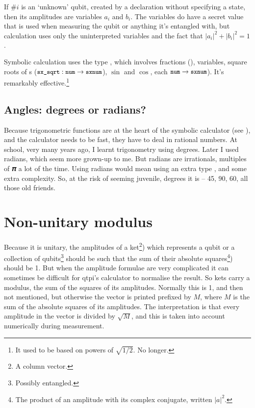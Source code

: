 If $\#i${} is an `unknown' qubit, created by a  declaration without specifying a state, then its amplitudes are variables $a_{i}$ and $b_{i}$. The variables do have a secret value that is used when measuring the qubit or anything it's entangled with, but calculation uses only the uninterpreted variables and the fact that $|a_{i}|^{2}+|b_{i}|^{2}=1$.

Symbolic calculation uses the type , which involves fractions (), variables, square roots of s ($\texttt{\small{}sx\_sqrt}: \texttt{\small{}num}->\texttt{\small{}sxnum}$), $\sin$ and $\cos$, each $\texttt{\small{}num}->\texttt{\small{}sxnum}$). It's remarkably effective.\footnote{It used to be based on powers of $\sqrt{1/2}$. No longer.}

\subsection{Angles: degrees or radians?}

Because trigonometric functions are at the heart of the symbolic calculator (see ), and the calculator needs to be fast, they have to deal in rational numbers. At school, very many years ago, I learnt trigonometry using degrees. Later I used radians, which seem more grown-up to me. But radians are irrationals, multiples of 𝝅 a lot of the time. Using radians would mean using an extra type , and some extra complexity. So, at the risk of seeming juvenile, degrees it is -- 45, 90, 60, all those old friends.

\section{Non-unitary modulus}

Because it is unitary, the amplitudes of a ket\footnote{A column vector.}) which represents a qubit or a collection of qubits\footnote{Possibly entangled.} should be such that the sum of their absolute squares\footnote{The product of an amplitude with its complex conjugate, written $|a|^{2}$.}) should be 1. But when the amplitude formulae are very complicated it can sometimes be difficult for qtpi's calculator to normalise the result. So kets carry a modulus, the sum of the squares of its amplitudes. Normally this is 1, and then not mentioned, but otherwise the vector is printed prefixed by \verbtt{<<}$M$\verbtt{>>}, where $M$ is the sum of the absolute squares of its amplitudes. The interpretation is that every amplitude in the vector is divided by $\sqrt{M}$, and this is taken into account numerically during measurement.

